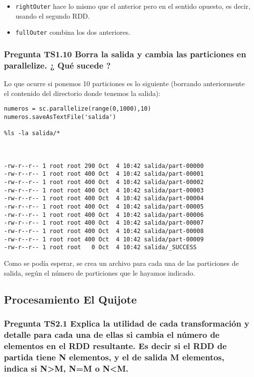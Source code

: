\documentclass[11pt]{article}
\def\inline{\lstinline[basicstyle=\ttfamily,keywordstyle={}]}
\begin{document}
{{\begin{itemize}
\begin{verbatim}
[('A', (1, 4)), ('A', (1, 5)), ('B', (2, 6)), ('C', (3, None))]
\end{verbatim}

\item  \inline{rightOuter} hace lo mismo que el anterior pero en el sentido opuesto, es decir, usando el segundo RDD.
\item  \inline{fullOuter} combina los dos anteriores.

\end{itemize}

\subsubsection*{ Pregunta TS1.10 Borra la salida y cambia las particiones en parallelize. ¿ Qué sucede ?}

Lo que ocurre si ponemos 10 particiones es lo siguiente (borrando anteriormente el contenido del directorio donde tenemos la salida):
\begin{verbatim}
numeros = sc.parallelize(range(0,1000),10)
numeros.saveAsTextFile('salida')

%ls -la salida/*



-rw-r--r-- 1 root root 290 Oct  4 10:42 salida/part-00000
-rw-r--r-- 1 root root 400 Oct  4 10:42 salida/part-00001
-rw-r--r-- 1 root root 400 Oct  4 10:42 salida/part-00002
-rw-r--r-- 1 root root 400 Oct  4 10:42 salida/part-00003
-rw-r--r-- 1 root root 400 Oct  4 10:42 salida/part-00004
-rw-r--r-- 1 root root 400 Oct  4 10:42 salida/part-00005
-rw-r--r-- 1 root root 400 Oct  4 10:42 salida/part-00006
-rw-r--r-- 1 root root 400 Oct  4 10:42 salida/part-00007
-rw-r--r-- 1 root root 400 Oct  4 10:42 salida/part-00008
-rw-r--r-- 1 root root 400 Oct  4 10:42 salida/part-00009
-rw-r--r-- 1 root root   0 Oct  4 10:42 salida/_SUCCESS
\end{verbatim}

Como se podía esperar, se crea un archivo para cada una de las particiones de salida, según el número de particiones que le hayamos indicado.

\subsection{Procesamiento El Quijote}

\subsubsection*{ Pregunta TS2.1 Explica la utilidad de cada transformación y detalle para cada una de ellas si cambia el número de elementos en el RDD resultante. Es decir si el RDD de partida tiene N elementos, y el de salida M elementos, indica si N>M, N=M o N<M.}

}}
\end{document}
